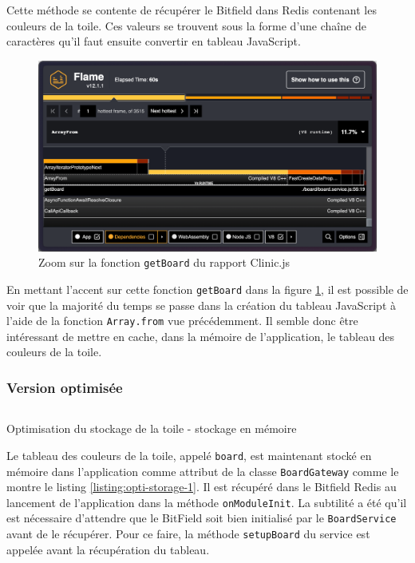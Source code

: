 Cette méthode se contente de récupérer le Bitfield dans Redis contenant les couleurs de la toile. Ces valeurs se trouvent sous la forme d'une chaîne de caractères qu'il faut ensuite convertir en tableau JavaScript.

\begin{figure}[H]
  \centering
  \includegraphics[width=1\textwidth]{./assets/figures/flame/flame3-getBoard.png}
  \caption{Zoom sur la fonction \texttt{getBoard} du rapport Clinic.js}
  \label{fig:flame3-getBoard}
\end{figure}

En mettant l'accent sur cette fonction \texttt{getBoard} dans la figure \ref{fig:flame3-getBoard}, il est possible de voir que la majorité du temps se passe dans la création du tableau JavaScript à l'aide de la fonction \texttt{Array.from} vue précédemment. Il semble donc être intéressant de mettre en cache, dans la mémoire de l'application, le tableau des couleurs de la toile.

\subsubsection{Version optimisée}

\begin{listing}[H]
  \inputminted[highlightlines={4,10,11},linenos]{ts}{assets/figures/opti-storage-1.ts}
  \caption{Optimisation du stockage de la toile - stockage en mémoire}
  \label{listing:opti-storage-1}
\end{listing}

Le tableau des couleurs de la toile, appelé \texttt{board}, est maintenant stocké en mémoire dans l'application comme attribut de la classe \texttt{BoardGateway} comme le montre le listing \ref{listing:opti-storage-1}. Il est récupéré dans le Bitfield Redis au lancement de l'application dans la méthode \texttt{onModuleInit}. La subtilité a été qu'il est nécessaire d'attendre que le BitField soit bien initialisé par le \texttt{BoardService} avant de le récupérer. Pour ce faire, la méthode \texttt{setupBoard} du service est appelée avant la récupération du tableau.

